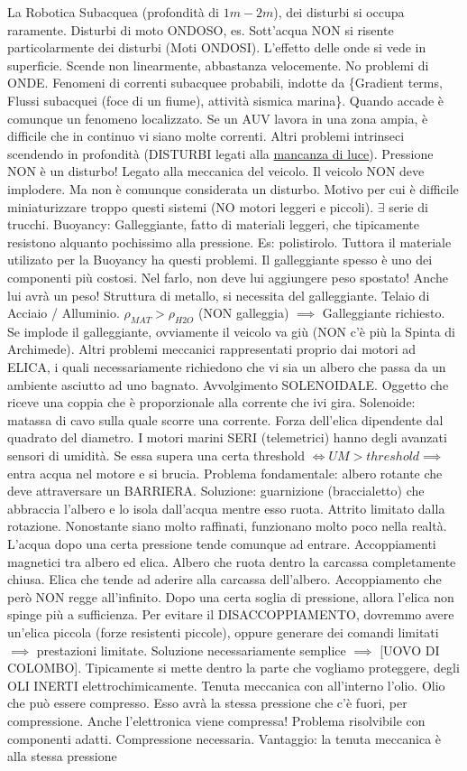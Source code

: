 La Robotica Subacquea (profondità di $1m-2m$), dei disturbi si occupa raramente. Disturbi di moto ONDOSO, es. Sott'acqua NON si risente particolarmente dei disturbi (Moti ONDOSI). L'effetto delle onde si vede in superficie. Scende non linearmente, abbastanza velocemente. No problemi di ONDE. Fenomeni di correnti subacquee probabili, indotte da \{Gradient terms, Flussi subacquei (foce di un fiume), attività sismica marina\}. Quando accade è comunque un fenomeno localizzato. Se un AUV lavora in una zona ampia, è difficile che in continuo vi siano molte correnti. Altri problemi intrinseci scendendo in profondità (DISTURBI legati alla \underline{mancanza di luce}). Pressione NON è un disturbo! Legato alla meccanica del veicolo. Il veicolo NON deve implodere. Ma non è comunque considerata un disturbo. Motivo per cui è difficile miniaturizzare troppo questi sistemi (NO motori leggeri e piccoli). $\exists$ serie di trucchi. Buoyancy: Galleggiante, fatto di materiali leggeri, che tipicamente resistono alquanto pochissimo alla pressione. Es: polistirolo. Tuttora il materiale utilizato per la Buoyancy ha questi problemi. Il galleggiante spesso è uno dei componenti più costosi. Nel farlo, non deve lui aggiungere peso spostato! Anche lui avrà un peso! Struttura di metallo, si necessita del galleggiante. Telaio di Acciaio / Alluminio. $\rho_{MAT} > \rho_{H2O}$ (NON galleggia) $\implies$ Galleggiante richiesto. Se implode il galleggiante, ovviamente il veicolo va giù (NON c'è più la Spinta di Archimede). Altri problemi meccanici rappresentati proprio dai motori ad ELICA, i quali necessariamente richiedono che vi sia un albero che passa da un ambiente asciutto ad uno bagnato. Avvolgimento SOLENOIDALE. Oggetto che riceve una coppia che è proporzionale alla corrente che ivi gira. Solenoide: matassa di cavo sulla quale scorre una corrente. Forza dell'elica dipendente dal quadrato del diametro. I motori marini SERI (telemetrici) hanno degli avanzati sensori di umidità. Se essa supera una certa threshold $\iff UM > threshold \implies$ entra acqua nel motore e si brucia. Problema fondamentale: albero rotante che deve attraversare un BARRIERA. Soluzione: guarnizione (braccialetto) che abbraccia l'albero e lo isola dall'acqua mentre esso ruota. Attrito limitato dalla rotazione. Nonostante siano molto raffinati, funzionano molto poco nella realtà. L'acqua dopo una certa pressione tende comunque ad entrare. Accoppiamenti magnetici tra albero ed elica. Albero che ruota dentro la carcassa completamente chiusa. Elica che tende ad aderire alla carcassa dell'albero. Accoppiamento che però NON regge all'infinito. Dopo una certa soglia di pressione, allora l'elica non spinge più a sufficienza. Per evitare il DISACCOPPIAMENTO, dovremmo avere un'elica piccola (forze resistenti piccole), oppure generare dei comandi limitati $\implies$ prestazioni limitate. Soluzione necessariamente semplice $\implies$ [UOVO DI COLOMBO]. Tipicamente si mette dentro la parte che vogliamo proteggere, degli OLI INERTI elettrochimicamente. Tenuta meccanica con all'interno l'olio. Olio che può essere compresso. Esso avrà la stessa pressione che c'è fuori, per compressione. Anche l'elettronica viene compressa! Problema risolvibile con componenti adatti. Compressione necessaria. Vantaggio: la tenuta meccanica è alla stessa pressione 